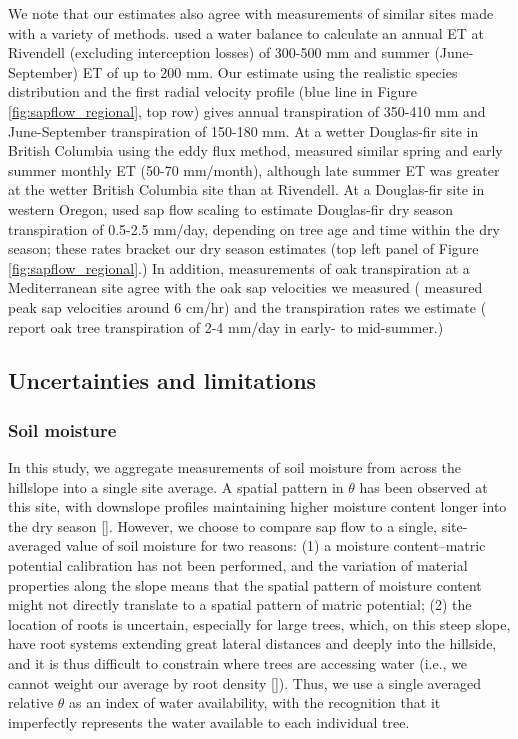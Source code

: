 We note that our estimates also agree with measurements of similar sites made with a variety of methods.  \cite{salve2012rain} used a water balance to calculate an annual ET at Rivendell (excluding interception losses) of 300-500 mm and summer (June-September) ET  of up to 200 mm.  Our estimate using the realistic species distribution and the first radial velocity profile (blue line in Figure \ref{fig:sapflow_regional}, top row) gives annual transpiration of 350-410 mm and June-September transpiration of 150-180 mm.  At a wetter Douglas-fir site in British Columbia using the eddy flux method, \cite{jassal2009evapotranspiration} measured similar spring and early summer monthly ET (50-70 mm/month), although late summer ET was greater at the wetter British Columbia site than at Rivendell.  At a Douglas-fir site in western Oregon, \cite{moore2004structural} used sap flow scaling to estimate Douglas-fir dry season transpiration of 0.5-2.5 mm/day, depending on tree age and time within the dry season; these rates bracket our dry season estimates (top left panel of Figure \ref{fig:sapflow_regional}.)  In addition, measurements of oak transpiration at a Mediterranean site agree with the oak sap velocities we measured (\cite{fisher2007towers} measured peak sap velocities around 6 cm/hr) and the transpiration rates we estimate (\cite{chen2008observations} report oak tree transpiration of 2-4 mm/day in early- to mid-summer.)

\subsection{Uncertainties and limitations}
\label{sec:sapflow_soilmoisture}

\subsubsection{Soil moisture}
In this study, we aggregate measurements of soil moisture from across the hillslope into a single site average.  A spatial pattern in $\theta$ has been observed at this site, with downslope profiles maintaining higher moisture content longer into the dry season [\cite{salve2012rain}].  However, we choose to compare sap flow to a single, site-averaged value of soil moisture for two reasons: (1) a moisture content--matric potential calibration has not been performed, and the variation of material properties along the slope means that the spatial pattern of moisture content might not directly translate to a spatial pattern of matric potential; (2) the location of roots is uncertain, especially for large trees, which, on this steep slope, have root systems extending great lateral distances and deeply into the hillside, and it is thus difficult to constrain where trees are accessing water (i.e., we cannot weight our average by root density [\cite{chen1994impact}]).  Thus, we use a single averaged relative $\theta$ as an index of water availability, with the recognition that it imperfectly represents the water available to each individual tree.

